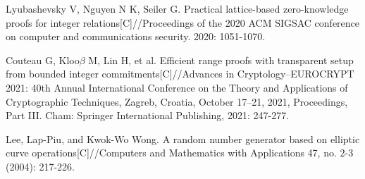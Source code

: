 \documentclass[zihao=-4]{ctexart}
\begin{document}
\begin{thebibliography}{2}
  Lyubashevsky V, Nguyen N K, Seiler G. Practical lattice-based zero-knowledge proofs for integer relations[C]//Proceedings of the 2020 ACM SIGSAC conference on computer and communications security. 2020: 1051-1070.

  Couteau G, Kloo$\beta$ M, Lin H, et al. Efficient range proofs with transparent setup from bounded integer commitments[C]//Advances in Cryptology–EUROCRYPT 2021: 40th Annual International Conference on the Theory and Applications of Cryptographic Techniques, Zagreb, Croatia, October 17–21, 2021, Proceedings, Part III. Cham: Springer International Publishing, 2021: 247-277.
	
	Lee, Lap-Piu, and Kwok-Wo Wong. A random number generator based on elliptic curve operations[C]//Computers and Mathematics with Applications 47, no. 2-3 (2004): 217-226.
\end{thebibliography}
\end{document}

